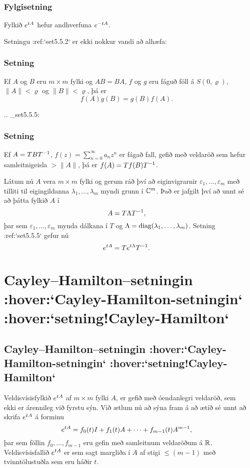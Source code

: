\subsubsection{Fylgisetning}
Fylkið $e\sp {tA}$ hefur andhverfuna $e\sp{-tA}$.


Setningu :ref:`set5.5.2` er ekki nokkur vandi að alhæfa:

\subsubsection{Setning}
Ef $A$ og $B$ eru $m\times m$ fylki og $AB=BA$, $f$ og $g$ eru fáguð
föll á $S(0,\varrho)$, $\|A\|< \varrho$ og $\|B\|<\varrho$, þá er
 $$f(A)g(B)=g(B)f(A).
 $$





.. _set5.5.5:

\subsubsection{Setning}
Ef $A=TBT\sp{-1}$, $f(z)=\sum_{n=0}^\infty a_nz^n$ er fágað fall,
gefið  með veldaröð sem hefur samleitnigeisla $>\|A\|$, þá er
$f(A)=Tf(B)T\sp{-1}$. 


\medskip
Látum nú $A$ vera $m\times m$ fylki og gerum ráð því að
eiginvigrarnir $\varepsilon_1,\dots,\varepsilon_m$ með tilliti til
eigingildanna $\lambda_1,\dots,\lambda_m$ myndi grunn í ${\mathbb C}\sp m$.
Það er jafgilt því að unnt sé að þátta fylkið $A$ í
 $$A=T\Lambda T\sp{-1},
 $$
þar sem $\varepsilon_1,\dots,\varepsilon_m$ mynda dálkana í
$T$ og $\Lambda={\operatorname{diag}}(\lambda_1,\dots,\lambda_m)$.
Setning :ref:`set5.5.5` gefur nú
 $$e\sp{t A}=Te\sp{t\Lambda} T\sp{-1}.
 $$



\section{Cayley--Hamilton--setningin :hover:`Cayley-Hamilton-setningin`
 :hover:`setning!Cayley-Hamilton`}

\subsection{Cayley--Hamilton--setningin :hover:`Cayley-Hamilton-setningin`
 :hover:`setning!Cayley-Hamilton`}

\noindent
Veldisvísisfylkið $e\sp {tA}$ af $m\times m$ fylki $A$,
 er gefið með óendanlegri veldaröð, sem
ekki er árennileg við fyrstu sýn.  Við ætlum nú að sýna fram á að
ætíð sé unnt að skrifa $e\sp{tA}$ á forminu
 $$e\sp{tA}= f_0(t)I+f_1(t)A+\cdots+f_{m-1}(t)A\sp{m-1}, 
 $$
þar sem föllin $f_0,\dots,f_{m-1}$ eru gefin með samleitnum
veldaröðum á ${\mathbb R}$.
Veldisvísisfallið $e\sp{tA}$ er sem sagt margliða í $A$ af stigi 
$\leq (m-1)$  með tvinntölustuðla sem eru háðir $t$.  

